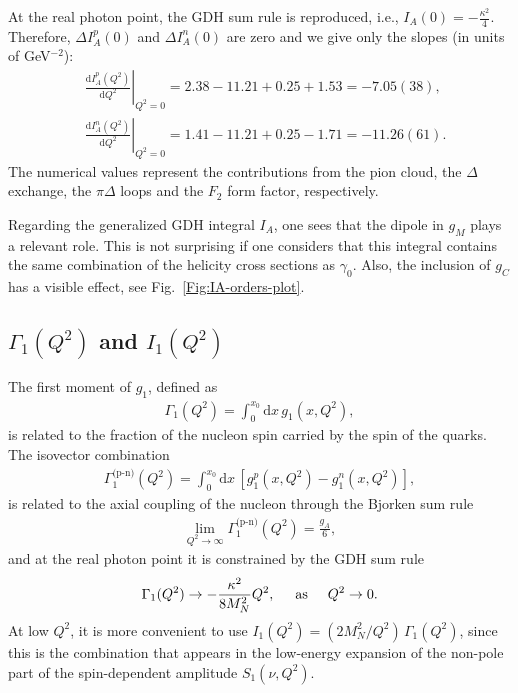 \documentclass[twocolumn,prc,showpacs,nofootinbib,preprintnumbers,amsmath,amssymb,superscriptaddress]{revtex4-1}
\def\dd{\mathrm{d}}
\begin{document}
At the real photon point, the GDH sum rule is reproduced, i.e., $I_A (0) = - \frac{\kappa^2}{4}$. Therefore, $\Delta I_A^p(0)$ and $\Delta I_A^n(0)$ are zero and we give only the slopes (in units of GeV$^{-2}$):
\begin{align}
&\left.\frac{\dd I_A^p (Q^2)}{\dd Q^2}\right|_{Q^2=0}= 2.38 -11.21 + 0.25 +1.53 =-7.05(38),\\
&\left.\frac{\dd I_A^n (Q^2)}{\dd Q^2}\right|_{Q^2=0}=  1.41 -11.21 + 0.25  -1.71= -11.26(61).
\end{align}
The numerical values represent the contributions from the pion cloud, the $\Delta$ exchange, the $\pi \Delta$ loops and the $F_2$ form factor, respectively.


Regarding the generalized GDH integral $I_A$, one sees that the dipole in $g_M$ plays a relevant role. 
This is not surprising if one considers that this integral contains the same combination of the helicity cross sections as $\gamma_0$. Also, the inclusion of $g_C$ has a visible effect, see Fig.~\ref{Fig:IA-orders-plot}.



\subsection{ $\Gamma_1(Q^2)$ and $I_1(Q^2)$} 

The first moment of $g_1$, defined as
\begin{align}
 \Gamma_1(Q^2) = \int^{x_0}_0\!\! \dd x\, g_1(x,Q^2), 
\end{align}
is related to the fraction of the nucleon spin carried by the spin of the quarks. 
 The isovector combination
 \begin{align}
 \Gamma^{\text{(p-n)}}_1(Q^2) = \int^{x_0}_0\!\! \dd x\, [g^p_1(x,Q^2) - g^n_1(x,Q^2) ], 
\end{align}
is related to the axial coupling of the nucleon through the Bjorken sum rule \cite{Bjorken:1966jh,Bjorken:1969mm}
 \begin{align}
\lim_{Q^2 \to \infty} \Gamma^{\text{(p-n)}}_1(Q^2) = \frac{g_A}{6},
\end{align}
and at the real photon point it is constrained by the GDH sum rule
\begin{align}
 \Gamma_1(Q^2) \to - \frac{\kappa^2}{8 M_N^2} Q^2, \text{\hspace{0.5cm}as\hspace{0.5cm}} Q^2 \to 0.
\end{align}
At low $Q^2$, it is more convenient to use $I_1(Q^2) = (2M_N^2/Q^2)\,\Gamma_1(Q^2)$, since this is the combination that appears in the low-energy expansion of the non-pole part of the spin-dependent amplitude $S_1(\nu, Q^2)$.
\end{document}
